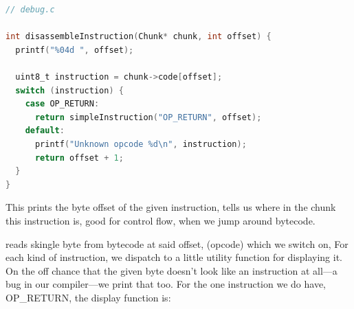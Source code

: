 \begin{lstlisting}[language=C]
// debug.c

int disassembleInstruction(Chunk* chunk, int offset) {
  printf("%04d ", offset);

  uint8_t instruction = chunk->code[offset];
  switch (instruction) {
    case OP_RETURN:
      return simpleInstruction("OP_RETURN", offset);
    default:
      printf("Unknown opcode %d\n", instruction);
      return offset + 1;
  }
}
\end{lstlisting}

This prints the byte offset of the given instruction, tells us where in the chunk this instruction is, good for control flow, when we jump around bytecode. 

reads skingle byte from bytecode at said offset, (opcode) which we switch on, For each kind of instruction, we dispatch to a little utility function for displaying it. On the off chance that the given byte doesn’t look like an instruction at all—a bug in our compiler—we print that too. For the one instruction we do have, OP_RETURN, the display function is:



